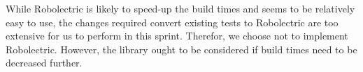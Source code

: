 While Robolectric is likely to speed-up the build times and seems to be relatively easy to use, the changes required convert existing tests to Robolectric are too extensive for us to perform in this sprint. Therefor, we choose not to implement Robolectric. However, the library ought to be considered if build times need to be decreased further.
